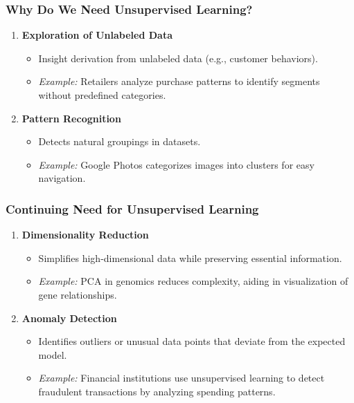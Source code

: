 \documentclass[aspectratio=169]{beamer}
\begin{document}
\begin{frame}[fragile]
    \frametitle{Why Do We Need Unsupervised Learning?}

    \begin{enumerate}
        \item \textbf{Exploration of Unlabeled Data}
            \begin{itemize}
                \item Insight derivation from unlabeled data (e.g., customer behaviors).
                \item \textit{Example:} Retailers analyze purchase patterns to identify segments without predefined categories.
            \end{itemize}
        
        \item \textbf{Pattern Recognition}
            \begin{itemize}
                \item Detects natural groupings in datasets.
                \item \textit{Example:} Google Photos categorizes images into clusters for easy navigation.
            \end{itemize}
    \end{enumerate}
\end{frame}

\begin{frame}[fragile]
    \frametitle{Continuing Need for Unsupervised Learning}

    \begin{enumerate}[resume]
        \item \textbf{Dimensionality Reduction}
            \begin{itemize}
                \item Simplifies high-dimensional data while preserving essential information.
                \item \textit{Example:} PCA in genomics reduces complexity, aiding in visualization of gene relationships.
            \end{itemize}

        \item \textbf{Anomaly Detection}
            \begin{itemize}
                \item Identifies outliers or unusual data points that deviate from the expected model.
                \item \textit{Example:} Financial institutions use unsupervised learning to detect fraudulent transactions by analyzing spending patterns.
            \end{itemize}
    \end{enumerate}
\end{frame}
\end{document}
